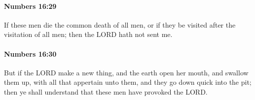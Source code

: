 		\paragraph{Numbers 16:29} %
			\label{NUMBERS-16-29}

			If these men die the common death of all men, or if they be visited after the visitation of all men; then the LORD hath not sent me.


		\paragraph{Numbers 16:30} %
			\label{NUMBERS-16-30}

			But if the LORD make a new thing, and the earth open her mouth, and swallow them up, with all that appertain unto them, and they go down quick into the pit; then ye shall understand that these men have provoked the LORD.


